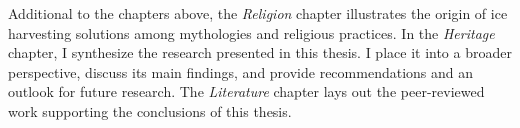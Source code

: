 Additional to the chapters above, the \textit{Religion} chapter illustrates the origin of ice harvesting solutions among
mythologies and religious practices. In the \textit{Heritage} chapter, I synthesize the research presented in this
thesis. I place it into a broader perspective, discuss its main findings, and provide recommendations and an
outlook for future research. The \textit{Literature} chapter lays out the peer-reviewed work supporting the conclusions of this
thesis.

%
%


